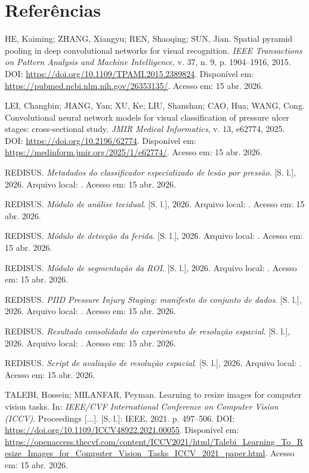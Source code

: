 \documentclass[
    12pt,
    openright,
    oneside,
    a4paper,
    chapter=TITLE,
    section=TITLE,
    brazil,
    sumario=tradicional,
    hidelinks
]{abntex2}
\newenvironment{abntrefs}{
    \begingroup
    \SingleSpacing
    \small
    \setlength{\parindent}{0pt}
    \setlength{\parskip}{\baselineskip}
    \raggedright
}{
    \par
    \endgroup
}
\begin{document}
\chapter*{Referências}
\begin{abntrefs}
HE, Kaiming; ZHANG, Xiangyu; REN, Shaoqing; SUN, Jian. Spatial pyramid pooling in deep convolutional networks for visual recognition. \textit{IEEE Transactions on Pattern Analysis and Machine Intelligence}, v. 37, n. 9, p. 1904--1916, 2015. DOI: \url{https://doi.org/10.1109/TPAMI.2015.2389824}. Disponível em: \url{https://pubmed.ncbi.nlm.nih.gov/26353135/}. Acesso em: 15 abr. 2026.

LEI, Changbin; JIANG, Yan; XU, Ke; LIU, Shanshan; CAO, Hua; WANG, Cong. Convolutional neural network models for visual classification of pressure ulcer stages: cross-sectional study. \textit{JMIR Medical Informatics}, v. 13, e62774, 2025. DOI: \url{https://doi.org/10.2196/62774}. Disponível em: \url{https://medinform.jmir.org/2025/1/e62774/}. Acesso em: 15 abr. 2026.

REDISUS. \textit{Metadados do classificador especializado de lesão por pressão}. [S. l.], 2026. Arquivo local: . Acesso em: 15 abr. 2026.

REDISUS. \textit{Módulo de análise tecidual}. [S. l.], 2026. Arquivo local: . Acesso em: 15 abr. 2026.

REDISUS. \textit{Módulo de detecção da ferida}. [S. l.], 2026. Arquivo local: . Acesso em: 15 abr. 2026.

REDISUS. \textit{Módulo de segmentação da ROI}. [S. l.], 2026. Arquivo local: . Acesso em: 15 abr. 2026.

REDISUS. \textit{PIID Pressure Injury Staging: manifesto do conjunto de dados}. [S. l.], 2026. Arquivo local: . Acesso em: 15 abr. 2026.

REDISUS. \textit{Resultado consolidado do experimento de resolução espacial}. [S. l.], 2026. Arquivo local: . Acesso em: 15 abr. 2026.

REDISUS. \textit{Script de avaliação de resolução espacial}. [S. l.], 2026. Arquivo local: . Acesso em: 15 abr. 2026.

TALEBI, Hossein; MILANFAR, Peyman. Learning to resize images for computer vision tasks. In: \textit{IEEE/CVF International Conference on Computer Vision (ICCV)}. Proceedings [...]. [S. l.]: IEEE, 2021. p. 497--506. DOI: \url{https://doi.org/10.1109/ICCV48922.2021.00055}. Disponível em: \url{https://openaccess.thecvf.com/content/ICCV2021/html/Talebi_Learning_To_Resize_Images_for_Computer_Vision_Tasks_ICCV_2021_paper.html}. Acesso em: 15 abr. 2026.
\end{abntrefs}
\end{document}
